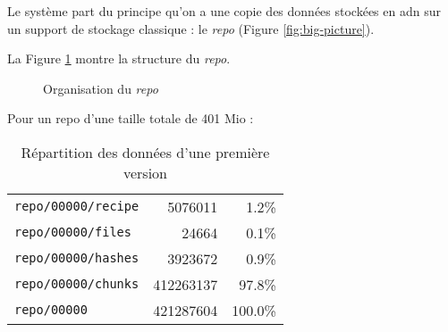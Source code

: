\documentclass[a4paper]{report}
\begin{document}
Le système part du principe qu'on a une copie des données stockées en
\ac{adn} sur un support de stockage classique : le \emph{repo} (Figure \ref{fig:big-picture}).
\begin{figure*}[ht]
\centering


\caption{Schéma global}
\label{fig:big-picture}
\end{figure*}

La Figure \ref{fig:repo-dir-tree} montre la structure du \emph{repo}. 

\begin{figure}
\caption{Organisation du \emph{repo}}
\label{fig:repo-dir-tree}
\end{figure}

Pour un repo d'une taille totale de 401 Mio :

\begin{table}[ht]
\centering
\begin{tabular}{l r r}
\verb|repo/00000/recipe| &   5076011 &   1.2\% \\
\verb|repo/00000/files| &      24664 &   0.1\% \\
\verb|repo/00000/hashes| &   3923672 &   0.9\% \\
\verb|repo/00000/chunks| & 412263137 &  97.8\% \\
\verb|repo/00000| &        421287604 & 100.0\% \\
\end{tabular}
\caption{Répartition des données d'une première version}
\label{fig:repo-data-distribution}
\end{table}
\end{document}
